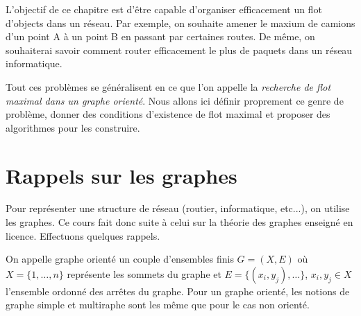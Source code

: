 
\minitoc 


L'objectif de ce chapitre est d'être capable d'organiser efficacement un flot d'objects 
dans un réseau. Par exemple, on souhaite amener le maxium de camions d'un point A à un point B 
en passant par certaines routes. De même, on souhaiterai savoir comment router efficacement le 
plus de paquets dans un réseau informatique. 

Tout ces problèmes se généralisent en ce que l'on appelle la \emph{recherche de flot maximal
dans un graphe orienté}. Nous allons ici définir proprement ce genre de problème, donner des conditions 
d'existence de flot maximal et proposer des algorithmes pour les construire. 



\section{Rappels sur les graphes}

Pour représenter une structure de réseau (routier, informatique, etc...), on utilise les graphes. 
Ce cours fait donc suite à celui sur la théorie des graphes enseigné en licence. Effectuons quelques rappels. 

\begin{definition}
    On appelle graphe orienté un couple d'ensembles finis $G = (X,E)$ où $X = \{1, \dots, n\}$ représente les sommets du graphe 
    et $E = \{ (x_i, y_j), \dots \}$, $ x_i, y_j \in X$ l'ensemble ordonné des arrêtes du graphe. 
    Pour un graphe orienté, les notions de graphe simple et multiraphe sont les même que pour le cas non orienté.
\end{definition}


